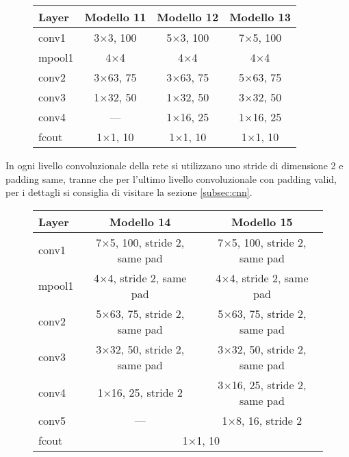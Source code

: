 \begin{figure}[H]
	\centering
	\begin{tabular}{lccc}
		\toprule
		\textbf{Layer} & \textbf{Modello 11} & \textbf{Modello 12} & \textbf{Modello 13}  	\\ 
		\midrule
		conv1 	& \num{3}$\times$\num{3}, 100	  & \num{5}$\times$\num{3}, 100 & \num{7}$\times$\num{5}, 100 	   \\
		mpool1 	& {\num{4}$\times$\num{4}}	&{\num{4}$\times$\num{4}}	& {\num{4}$\times$\num{4}}	 \\
		conv2  	& \num{3}$\times$\num{63}, 75 &  \num{3}$\times$\num{63}, 75	  &		\num{5}$\times$\num{63}, 75    \\
		conv3  	&\num{1}$\times$\num{32}, 50	  & \num{1}$\times$\num{32}, 50  &	\num{3}$\times$\num{32}, 50 	  \\
		conv4  	& ---	  & \num{1}$\times$\num{16}, 25  &	\num{1}$\times$\num{16}, 25 	  \\
		fcout	&{\num{1}$\times$\num{1}, 10} &{\num{1}$\times$\num{1}, 10}&{\num{1}$\times$\num{1}, 10}		   \\
		\bottomrule	
	\end{tabular}
	\label{tab:netemb4}
\end{figure}

In ogni livello convoluzionale della rete si utilizzano uno stride di dimensione 2 e padding same, tranne che per l'ultimo livello convoluzionale con padding valid, per i dettagli si consiglia di visitare la sezione { \ref{subsec:cnn}}.

\begin{figure}[H]
	\centering
	\begin{tabular}{lcc}
		\toprule
		\textbf{Layer} & \textbf{Modello 14} & \textbf{Modello 15}   	\\ 
		\midrule
		conv1 	& {\num{7}$\times$\num{5}, 100, stride 2, same pad}&{\num{7}$\times$\num{5}, 100, stride 2, same pad} \\
		mpool1 	& {\num{4}$\times$\num{4}, stride 2, same pad} &{\num{4}$\times$\num{4}, stride 2, same pad}  \\
		conv2  	& {\num{5}$\times$\num{63}, 75, stride 2, same pad}&{\num{5}$\times$\num{63}, 75, stride 2, same pad}    \\
		conv3  	&  {\num{3}$\times$\num{32}, 50, stride 2, same pad} &{\num{3}$\times$\num{32}, 50, stride 2, same pad} 	  \\
		conv4  	& \num{1}$\times$\num{16}, 25, stride 2  &	\num{3}$\times$\num{16}, 25, stride 2, same pad 	  \\
		conv5  	& ---  &	\num{1}$\times$\num{8}, 16, stride 2 	  \\
		fcout	& \multicolumn{2}{c}{\num{1}$\times$\num{1}, 10}		   \\
		\bottomrule	
	\end{tabular}
	\label{tab:rmsebin2}
\end{figure}

